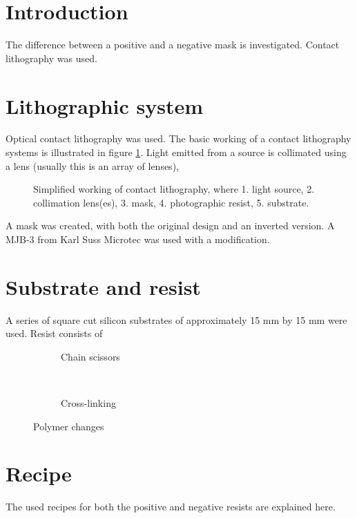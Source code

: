 \section*{Introduction}
The difference between a positive and a negative mask is investigated. Contact lithography was used.

\section*{Lithographic system}
Optical contact lithography was used. The basic working of a contact lithography systems is illustrated in figure \ref{fig:contact-litho}. Light emitted from a source is collimated using a lens (usually this is an array of lenses), 
\begin{figure}[H]
	\centering
	\resizebox{0.7\linewidth}{!}{}
	\caption{Simplified working of contact lithography, where 1. light source, 2. collimation lens(es), 3. mask, 4. photographic resist, 5. substrate.}
	\label{fig:contact-litho}
\end{figure}
A mask was created, with both the original design and an inverted version.  A MJB-3 from Karl Suss Microtec was used with a modification. 

\section*{Substrate and resist}
A series of square cut silicon substrates of approximately 15 mm by 15 mm were used. Resist consists of 

\begin{figure}[H]
	\centering
	\begin{subfigure}[t]{0.45\linewidth}
		\centering
		\resizebox{\linewidth}{!}{}
		\caption{Chain scissors}
		\label{fig:chainscissor}
	\end{subfigure}
	~
	\begin{subfigure}[t]{0.45\linewidth}
		\centering
		\resizebox{\linewidth}{!}{}
		\caption{Cross-linking}
		\label{fig:crosslinking}
	\end{subfigure}
	\caption{Polymer changes}
	\label{fig:polymers}
\end{figure}


\section*{Recipe}
The used recipes for both the positive and negative resists are explained here.

